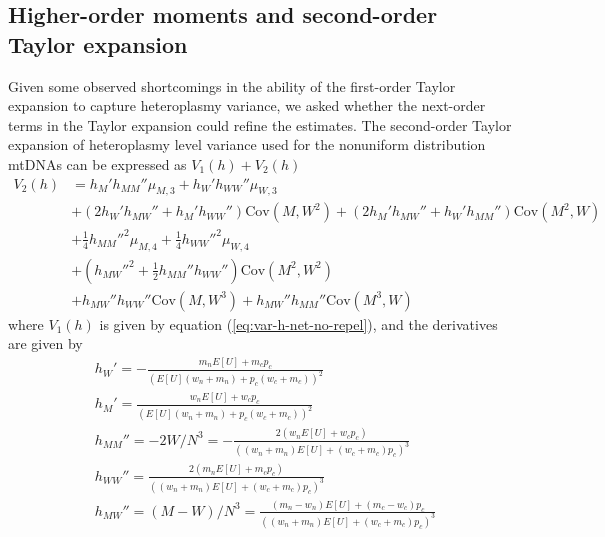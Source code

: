 \documentclass{article}
\begin{document}
\begin{appendices}
\subsection{Higher-order moments and second-order Taylor expansion}\label{app:V2hGen_Moments}
Given some observed shortcomings in the ability of the first-order Taylor expansion to capture heteroplasmy variance, we asked whether the next-order terms in the Taylor expansion could refine the estimates. The second-order Taylor expansion of heteroplasmy level variance used for the nonuniform distribution mtDNAs can be expressed as $V_1(h)+V_2(h)$
\begin{equation}
    \begin{split}
        V_2(h) & =  h_M'h_{MM}''\mu_{M,3} + h_W'h_{WW}''\mu_{W,3}\\
       & + (2h_W'h_{MW}''+h_M'h_{WW}'')\mathrm{Cov}(M,W^2) + (2h_M'h_{MW}''+h_W'h_{MM}'')\mathrm{Cov}(M^2,W)\\
       & + \frac{1}{4}h_{MM}''^2\mu_{M,4}
         +\frac{1}{4}h_{WW}''^2\mu_{W,4}\\
       & + (h_{MW}''^2+\frac{1}{2}h_{MM}''h_{WW}'')\mathrm{Cov}(M^2,W^2)\\
       & + h_{MW}''h_{WW}''\mathrm{Cov}(M,W^3)+h_{MW}''h_{MM}''\mathrm{Cov}(M^3,W)
    \end{split}
\end{equation}
where $V_1(h)$ is given by equation (\ref{eq:var-h-net-no-repel}), and the derivatives are given by
\begin{equation*}
    \begin{split}
        & h_W' =-\frac{m_nE[U]+m_cp_c}{(E[U](w_n+m_n)+p_c(w_c+m_c))^2}\\
        & h_M' = \frac{w_nE[U]+w_cp_c}{(E[U](w_n+m_n)+p_c(w_c+m_c))^2}\\
        & h_{MM}'' = -2W/N^3=-\frac{2(w_nE[U]+w_cp_c)}{((w_n+m_n)E[U]+(w_c+m_c)p_c)^3}\\
        & h_{WW}'' = \frac{2(m_nE[U]+m_cp_c)}{((w_n+m_n)E[U]+(w_c+m_c)p_c)^3}\\
        & h_{MW}'' = (M-W)/N^3=\frac{(m_n-w_n)E[U]+(m_c-w_c)p_c}{((w_n+m_n)E[U]+(w_c+m_c)p_c)^3}
    \end{split}
\end{equation*}


\end{appendices}
\end{document}
